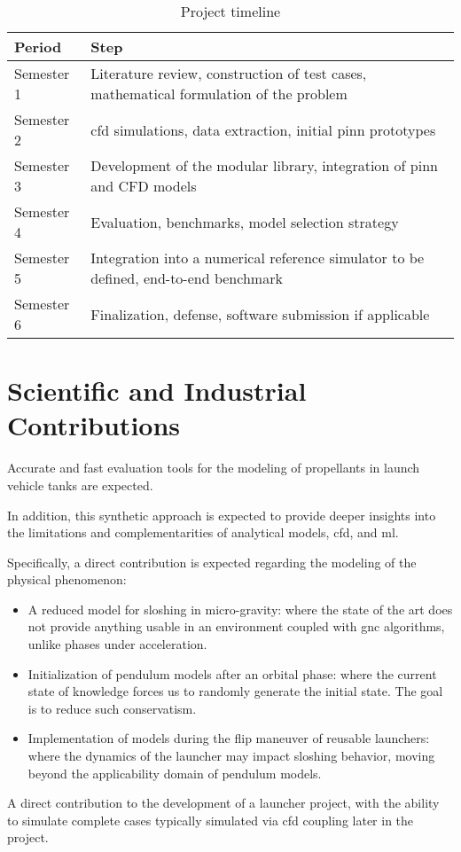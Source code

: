 \documentclass[12pt]{article}
\begin{document}
	\begin{table}[h]
		\centering
		\begin{tabularx}{\textwidth}{l X}
			
			\hline
			
			Period & Step \\
			
			\hline
			
			Semester 1 & Literature review, construction of test cases, mathematical formulation of the problem \\
			Semester 2 & \acrshort{cfd} simulations, data extraction, initial \acrshort{pinn} prototypes \\
			Semester 3 & Development of the modular library, integration of \acrshort{pinn} and CFD models \\
			Semester 4 & Evaluation, benchmarks, model selection strategy \\
			Semester 5 & Integration into a numerical reference simulator to be defined, end-to-end benchmark \\
			Semester 6 & Finalization, defense, software submission if applicable \\
			
			\hline
			
		\end{tabularx}
		\caption{Project timeline}
	\end{table}	
	
	\section*{Scientific and Industrial Contributions}
	
	Accurate and fast evaluation tools for the modeling of propellants in launch vehicle tanks are expected.
	
	In addition, this synthetic approach is expected to provide deeper insights into the limitations and complementarities of analytical models, \acrshort{cfd}, and \acrlong{ml}.
	
	Specifically, a direct contribution is expected regarding the modeling of the physical phenomenon:
	\begin{itemize}
		\item A reduced model for sloshing in micro-gravity: where the state of the art does not provide anything usable in an environment coupled with \acrshort{gnc} algorithms, unlike phases under acceleration.
		\item Initialization of pendulum models after an orbital phase: where the current state of knowledge forces us to randomly generate the initial state. The goal is to reduce such conservatism.
		\item Implementation of models during the flip maneuver of reusable launchers: where the dynamics of the launcher may impact sloshing behavior, moving beyond the applicability domain of pendulum models.
	\end{itemize}
	A direct contribution to the development of a launcher project, with the ability to simulate complete cases typically simulated via \acrshort{cfd} coupling later in the project.
	
\end{document}
